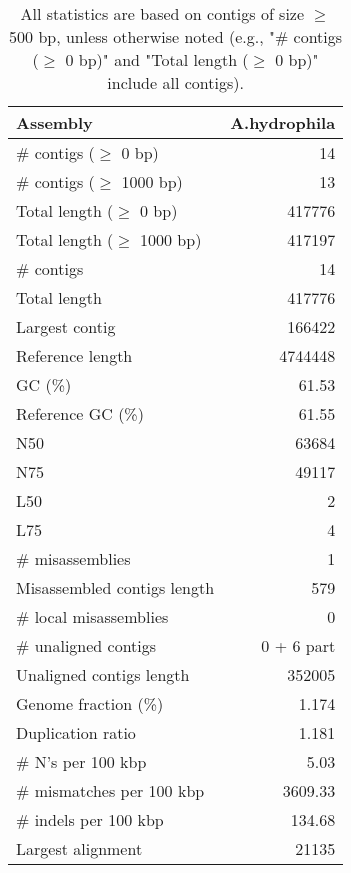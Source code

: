 \documentclass[12pt,a4paper]{article}
\begin{document}
\begin{table}[ht]
\begin{center}
\caption{All statistics are based on contigs of size $\geq$ 500 bp, unless otherwise noted (e.g., "\# contigs ($\geq$ 0 bp)" and "Total length ($\geq$ 0 bp)" include all contigs).}
\begin{tabular}{|l*{1}{|r}|}
\hline
Assembly & A.hydrophila \\ \hline
\# contigs ($\geq$ 0 bp) & 14 \\ \hline
\# contigs ($\geq$ 1000 bp) & 13 \\ \hline
Total length ($\geq$ 0 bp) & 417776 \\ \hline
Total length ($\geq$ 1000 bp) & 417197 \\ \hline
\# contigs & 14 \\ \hline
Total length & 417776 \\ \hline
Largest contig & 166422 \\ \hline
Reference length & 4744448 \\ \hline
GC (\%) & 61.53 \\ \hline
Reference GC (\%) & 61.55 \\ \hline
N50 & 63684 \\ \hline
N75 & 49117 \\ \hline
L50 & 2 \\ \hline
L75 & 4 \\ \hline
\# misassemblies & 1 \\ \hline
Misassembled contigs length & 579 \\ \hline
\# local misassemblies & 0 \\ \hline
\# unaligned contigs & 0 + 6 part \\ \hline
Unaligned contigs length & 352005 \\ \hline
Genome fraction (\%) & 1.174 \\ \hline
Duplication ratio & 1.181 \\ \hline
\# N's per 100 kbp & 5.03 \\ \hline
\# mismatches per 100 kbp & 3609.33 \\ \hline
\# indels per 100 kbp & 134.68 \\ \hline
Largest alignment & 21135 \\ \hline
\end{tabular}
\end{center}
\end{table}
\end{document}
